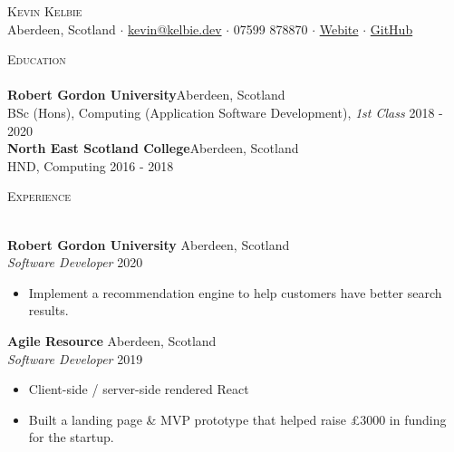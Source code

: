 \documentclass[a4paper]{article}
\newcommand{\lineunder} {
    \vspace*{-8pt} \\
    \hspace*{-18pt} \hrulefill \\
}
\newcommand{\header} [1] {
    {\hspace*{-18pt}\vspace*{6pt} \textsc{#1}}
    \vspace*{-6pt} \lineunder
}
\begin{document}
\vspace*{-40pt}

    

\vspace*{-10pt}
\begin{center}
	{\Huge \scshape {Kevin Kelbie}}\\
	Aberdeen, Scotland $\cdot$ \href{mailto:kevin@kelbie.dev}{kevin@kelbie.dev} $\cdot$ 07599 878870 $\cdot$ \href{https://kelbie.dev}{Webite} $\cdot$ \href{https://github.com/kelbie}{GitHub}\\
\end{center}

\header{Education}
\textbf{Robert Gordon University}\hfill Aberdeen, Scotland\\
BSc (Hons), Computing (Application Software Development), \textit{1st Class} \hfill 2018 - 2020\\
\vspace{2mm}
\textbf{North East Scotland College}\hfill Aberdeen, Scotland\\
HND, Computing \hfill 2016 - 2018\\
\vspace{2mm}

\header{Experience}
\vspace{1mm}

\textbf{Robert Gordon University} \hfill Aberdeen, Scotland\\
\textit{Software Developer} \hfill 2020\\
\vspace{-1mm}
\begin{itemize} \itemsep 1pt
	\item Implement a recommendation engine to help customers have better search results.
\end{itemize}

\textbf{Agile Resource} \hfill Aberdeen, Scotland\\
\textit{Software Developer} \hfill 2019\\
\vspace{-1mm}
\begin{itemize} \itemsep 1pt
	\item Client-side / server-side rendered React
	\item Built a landing page \& MVP prototype that helped raise £3000 in funding for the startup.
\end{itemize}
\end{document}
